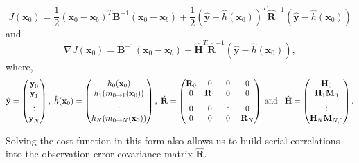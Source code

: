 \documentclass[11pt]{article}
\begin{document}
\begin{equation}
J(\textbf{x}_0) = \frac{1}{2}(\textbf{x}_0-\textbf{x}_b)^{T}\textbf{B}^{-1}(\textbf{x}_0-\textbf{x}_b)+\frac{1}{2}(\hat{\textbf{y}}-\hat{h}(\textbf{x}_0))^{T}\hat{\textbf{R}}^{-1}(\hat{\textbf{y}}-\hat{h}(\textbf{x}_0)) \label{costfn}
\end{equation}
and
\begin{equation}
\nabla J(\textbf{x}_0) = \textbf{B}^{-1}(\textbf{x}_0-\textbf{x}_b)-\hat{\mathbf{H}}^{T}\hat{\textbf{R}}^{-1}(\hat{\textbf{y}}-\hat{h}(\textbf{x}_0)), \label{gradcostfn}
\end{equation}
where,
\begin{equation}
\hat{\textbf{y}}=
\begin{pmatrix}
\textbf{y}_0 \\
\textbf{y}_1\\
\vdots \\
\textbf{y}_N
\end{pmatrix},
\hspace{1mm}
\hat{h}(\textbf{x}_0)=
\begin{pmatrix}
h_0(\textbf{x}_0) \\
h_1(m_{0\rightarrow 1}(\mathbf{x}_{0}))\\
\vdots \\
h_N(m_{0\rightarrow N}(\mathbf{x}_{0}))
\end{pmatrix},
\hspace{1mm}
\hat{\mathbf{R}}=
\begin{pmatrix}
\mathbf{R}_0 & 0 & 0 & 0 \\
0 & \mathbf{R}_1 & 0 & 0 \\
0 & 0 & \ddots & 0 \\
0 & 0 & 0 & \mathbf{R}_N
\end{pmatrix}
\hspace{1mm} \text{and} \hspace{3mm}
\hat{\mathbf{H}}=
\begin{pmatrix}
\mathbf{H}_0 \\
\mathbf{H}_1\mathbf{M}_0\\
\vdots \\
\mathbf{H}_N\mathbf{M}_{N,0}
\end{pmatrix}.
\end{equation}

Solving the cost function in this form also allows us to build serial correlations into the observation error covariance matrix $\hat{\mathbf{R}}$.
\end{document}

